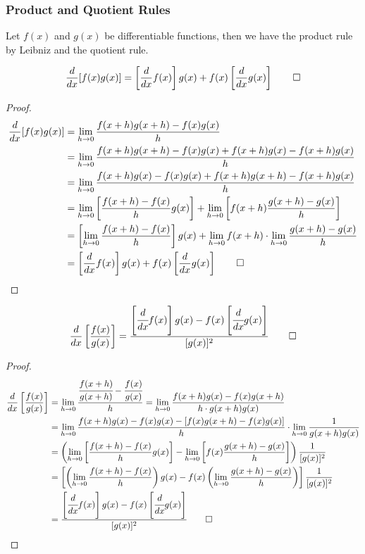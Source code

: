 \subsubsection{Product and Quotient Rules}
Let \(f(x)\) and \(g(x)\) be differentiable functions, then we have the
product rule by Leibniz and the quotient rule.
\begin{theorem}
    \[\frac{d}{dx}[f(x)g(x)]=\left[\frac{d}{dx}f(x)\right]g(x)
    +f(x)\left[\frac{d}{dx}g(x)\right] \qedhere\]
\end{theorem}
\begin{proof}
    \begin{align*}
        \frac{d}{dx}[f(x)g(x)]
        &= \lim_{h\to 0}\frac{f(x+h)g(x+h)-f(x)g(x)}{h} \\
        &= \lim_{h\to 0}\frac{f(x+h)g(x+h)-f(x)g(x)+f(x+h)g(x)-f(x+h)g(x)}{h} \\
        &= \lim_{h\to 0}\frac{f(x+h)g(x)-f(x)g(x)+f(x+h)g(x+h)-f(x+h)g(x)}{h} \\
        &= \lim_{h\to 0}\left[\frac{f(x+h)-f(x)}{h}g(x)\right]
        +\lim_{h\to 0}\left[f(x+h)\frac{g(x+h)-g(x)}{h}\right] \\
        &= \left[\lim_{h\to 0}\frac{f(x+h)-f(x)}{h}\right]g(x)
        +\lim_{h\to 0}f(x+h)\cdot\lim_{h\to 0}\frac{g(x+h)-g(x)}{h} \\
        &= \left[\frac{d}{dx}f(x)\right]g(x)
        +f(x)\left[\frac{d}{dx}g(x)\right] \qedhere
    \end{align*}
\end{proof}
\begin{theorem}
    \[\frac{d}{dx}\left[\frac{f(x)}{g(x)}\right]
    =\frac{\left[\cfrac{d}{dx}f(x)\right]g(x)
    -f(x)\left[\cfrac{d}{dx}g(x)\right]}{[g(x)]^2} \qedhere\]
\end{theorem}
\begin{proof}
    \begin{align*}
        \frac{d}{dx}\left[\frac{f(x)}{g(x)}\right]
        &= \lim_{h\to 0}\frac{\cfrac{f(x+h)}{g(x+h)}-\cfrac{f(x)}{g(x)}}{h}
        =\lim_{h\to 0}\frac{f(x+h)g(x)-f(x)g(x+h)}{h\cdot g(x+h)g(x)} \\
        &= \lim_{h\to 0}\frac{f(x+h)g(x)-f(x)g(x)-[f(x)g(x+h)-f(x)g(x)]}{h}
        \cdot\lim_{h\to 0}\frac{1}{g(x+h)g(x)} \\
        &= \left(\lim_{h\to 0}\left[\frac{f(x+h)-f(x)}{h}g(x)\right]
        -\lim_{h\to 0}\left[f(x)\frac{g(x+h)-g(x)}{h}\right]\right)
        \frac{1}{[g(x)]^2} \\
        &= \left[\left(\lim_{h\to 0}\frac{f(x+h)-f(x)}{h}\right)g(x)
        -f(x)\left(\lim_{h\to 0}\frac{g(x+h)-g(x)}{h}\right)\right]
        \frac{1}{[g(x)]^2} \\
        &= \frac{\left[\cfrac{d}{dx}f(x)\right]g(x)
        -f(x)\left[\cfrac{d}{dx}g(x)\right]}{[g(x)]^2} \qedhere
    \end{align*}
\end{proof}

